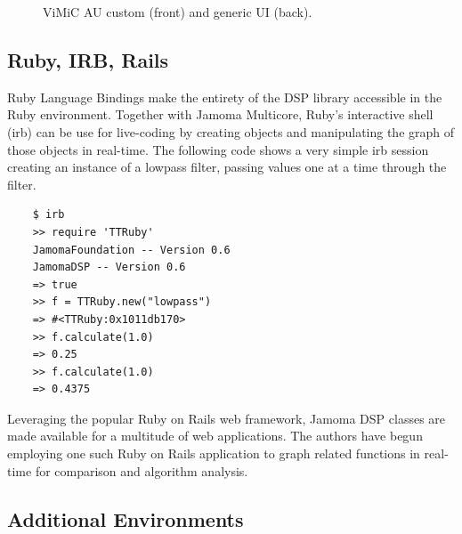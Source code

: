\documentclass[twoside,10pt]{article}
\begin{document}
\begin{figure}[htbp]
\centerline{}
\caption{ViMiC AU custom (front) and generic UI (back).}
\label{fig:vimic}
\end{figure}


\subsection{Ruby, IRB, Rails}

Ruby Language Bindings make the entirety of the DSP library accessible in the Ruby environment.  Together with Jamoma Multicore, Ruby's interactive shell (irb) can be use for live-coding by creating objects and manipulating the graph of those objects in real-time.  The following code shows a very simple irb session creating an instance of a lowpass filter, passing values one at a time through the filter.

\begin{lstlisting}
    $ irb
    >> require 'TTRuby'
    JamomaFoundation -- Version 0.6
    JamomaDSP -- Version 0.6
    => true
    >> f = TTRuby.new("lowpass")
    => #<TTRuby:0x1011db170>
    >> f.calculate(1.0)
    => 0.25
    >> f.calculate(1.0)
    => 0.4375
\end{lstlisting}

Leveraging the popular Ruby on Rails web framework, Jamoma DSP classes are made available for a multitude of web applications.  The authors have begun employing one such Ruby on Rails application to graph related functions in real-time for comparison and algorithm analysis.


\subsection{Additional Environments}
\end{document}
